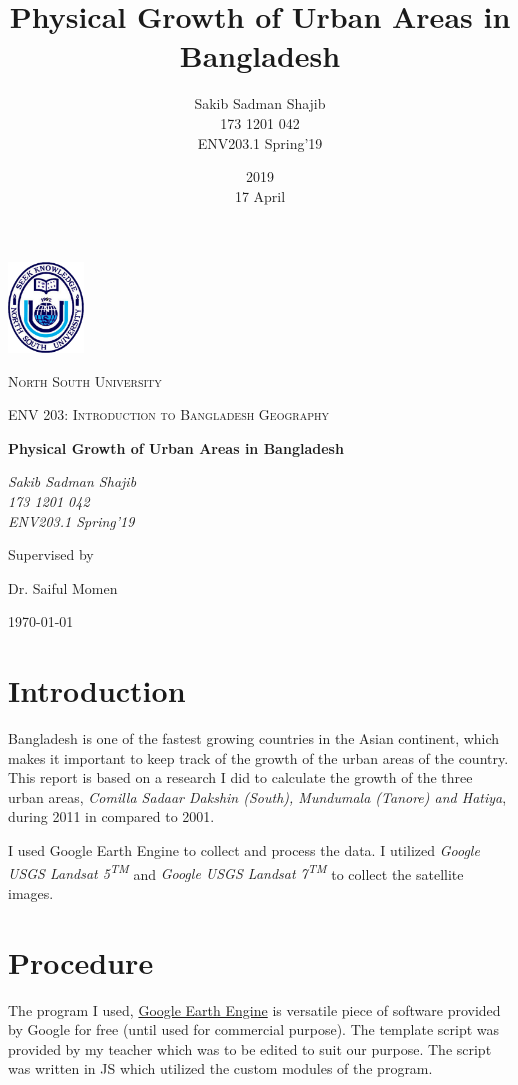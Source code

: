 \documentclass{article}
\title{Physical Growth of Urban Areas in Bangladesh}
\date{2019\\ 17 April}
\author{Sakib Sadman Shajib\\ 173 1201 042\\ ENV203.1 Spring'19}
\begin{document}
\begin{titlepage}
\centering
	\includegraphics[width=0.15\textwidth]{nsulogo}\par\vspace{1cm}
	{\scshape\LARGE North South University \par}
	\vspace{1cm}
	{\scshape\Large ENV 203: Introduction to Bangladesh Geography\par}
	\vspace{1.5cm}
	{\huge\bfseries Physical Growth of Urban Areas in Bangladesh\par}
	\vspace{2cm}
	{\Large\itshape Sakib Sadman Shajib\\ 173 1201 042\\ ENV203.1 Spring'19\par}
	\vfill
	Supervised by\par
	Dr. Saiful Momen

	\vfill

	{\large \today\par}
\end{titlepage}
\section{Introduction}
Bangladesh is one of the fastest growing countries in the Asian continent, which makes it important to keep track of the growth of the urban areas of the country. This report is based on a research I did to calculate the growth of the three urban areas, \textit{Comilla Sadaar Dakshin (South), Mundumala (Tanore) and Hatiya}, during 2011 in compared to 2001.

I used Google Earth Engine to collect and process the data. I utilized \textit{Google USGS Landsat 5\textsuperscript{TM}} and \textit{Google USGS Landsat 7\textsuperscript{TM}} to collect the satellite images.
\section{Procedure}
The program I used, \href{https://code.earthengine.google.com/}{Google Earth Engine} is versatile piece of software provided by Google for free (until used for commercial purpose). The template script was provided by my teacher which was to be edited to suit our purpose. The script was written in JS which utilized the custom modules of the program.
\end{document}
